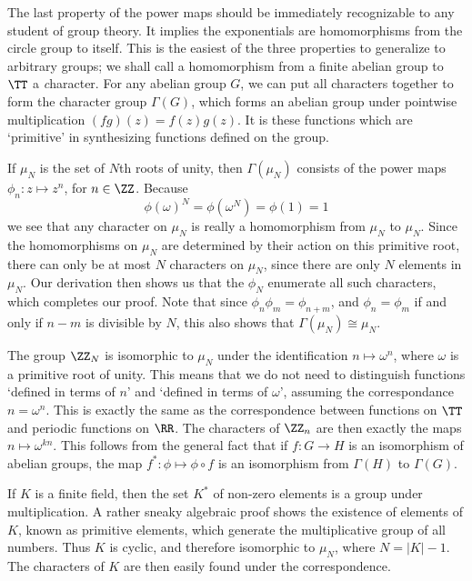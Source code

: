 The last property of the power maps should be immediately recognizable to any student of group theory. It implies the exponentials are homomorphisms from the circle group to itself. This is the easiest of the three properties to generalize to arbitrary groups; we shall call a homomorphism from a finite abelian group to $\TT$ a {\emph character}. For any abelian group $G$, we can put all characters together to form the character group $\Gamma(G)$, which forms an abelian group under pointwise multiplication $(fg)(z) = f(z)g(z)$. It is these functions which are `primitive' in synthesizing functions defined on the group.

\begin{example}
    If $\mu_N$ is the set of $N$th roots of unity, then $\Gamma(\mu_N)$ consists of the power maps $\phi_n: z \mapsto z^n$, for $n \in \ZZ$. Because
    \[ \phi(\omega)^N = \phi(\omega^N) = \phi(1) = 1 \]
    we see that any character on $\mu_N$ is really a homomorphism from $\mu_N$ to $\mu_N$. Since the homomorphisms on $\mu_N$ are determined by their action on this primitive root, there can only be at most $N$ characters on $\mu_N$, since there are only $N$ elements in $\mu_N$. Our derivation then shows us that the $\phi_N$ enumerate all such characters, which completes our proof. Note that since $\phi_n \phi_m = \phi_{n+m}$, and $\phi_n = \phi_m$ if and only if $n - m$ is divisible by $N$, this also shows that $\Gamma(\mu_N) \cong \mu_N$.
\end{example}

\begin{example}
    The group $\ZZ_N$ is isomorphic to $\mu_N$ under the identification $n \mapsto \omega^n$, where $\omega$ is a primitive root of unity. This means that we do not need to distinguish functions `defined in terms of $n$' and `defined in terms of $\omega$', assuming the correspondance $n = \omega^n$. This is exactly the same as the correspondence between functions on $\TT$ and periodic functions on $\RR$. The characters of $\ZZ_n$ are then exactly the maps $n \mapsto \omega^{kn}$. This follows from the general fact that if $f: G \to H$ is an isomorphism of abelian groups, the map $f^*: \phi \mapsto \phi \circ f$ is an isomorphism from $\Gamma(H)$ to $\Gamma(G)$.
\end{example}

\begin{example}
    If $K$ is a finite field, then the set $K^*$ of non-zero elements is a group under multiplication. A rather sneaky algebraic proof shows the existence of elements of $K$, known as primitive elements, which generate the multiplicative group of all numbers. Thus $K$ is cyclic, and therefore isomorphic to $\mu_N$, where $N = |K| - 1$. The characters of $K$ are then easily found under the correspondence.
\end{example}

